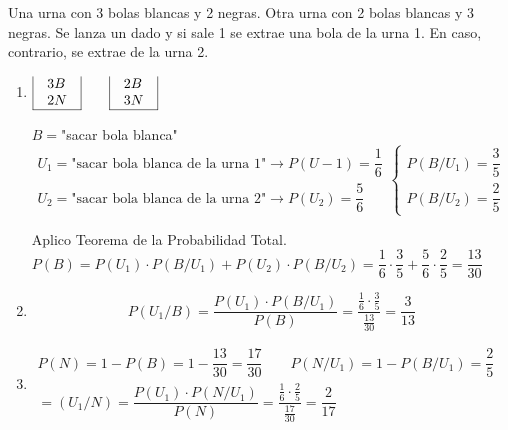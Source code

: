 Una urna con 3 bolas blancas y 2 negras. Otra urna con 2 bolas blancas y 3 negras. Se lanza un dado y si sale 1 se extrae una bola de la urna 1. En caso, contrario, se extrae de la urna 2.
\begin{enumerate}[label=\color{red}\alph*)]
	\item {}
	
	$\begin{array}{|c|}
		\begin{array}{l}
			3B\\
			2N
		\end{array}\\ \hline
	\end{array}\qquad\begin{array}{|c|}
	\begin{array}{l}
		2B\\
		3N
	\end{array}\\ \hline
	\end{array}$
	
	$B=$"sacar bola blanca"\\
	$\begin{array}{l}
		U_1=\text{"sacar bola blanca de la urna 1"}\longrightarrow P(U-1)=\dfrac{1}{6}\\
		U_2=\text{"sacar bola blanca de la urna 2"}\longrightarrow P(U_2)=\dfrac{5}{6}
	\end{array}\begin{cases}
	P(B/U_1)=\dfrac{3}{5}\\
	P(B/U_2)=\dfrac{2}{5}
	\end{cases}$
	
	Aplico Teorema de la Probabilidad Total.\\
	$P(B)=P(U_1)\cdot P(B/U_1)+P(U_2)\cdot P(B/U_2)=\dfrac{1}{6}\cdot\dfrac{3}{5}+\dfrac{5}{6}\cdot\dfrac{2}{5}=\dfrac{13}{30}$
	\item {} \[ P(U_1/B)=\dfrac{P(U_1)\cdot P(B/U_1)}{P(B)}=\dfrac{\frac{1}{6}\cdot\frac{3}{5}}{\frac{13}{30}}=\dfrac{3}{13} \]
	\item {}
	
	$\begin{array}{l}
		P(N)=1-P(B)=1-\dfrac{13}{30}=\dfrac{17}{30}\qquad P(N/U_1)=1-P(B/U_1)=\dfrac{2}{5}\\
		=(U_1/N)=\dfrac{P(U_1)\cdot P(N/U_1)}{P(N)}=\dfrac{\frac{1}{6}\cdot\frac{2}{5}}{\frac{17}{30}}=\dfrac{2}{17}
	\end{array}$
\end{enumerate}

